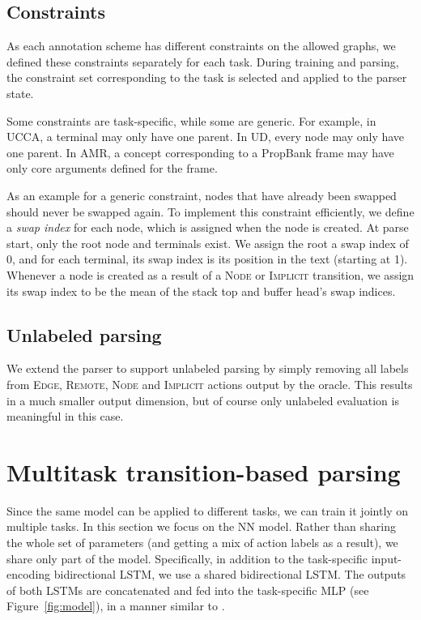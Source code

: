 \documentclass[11pt,a4paper]{article}
\begin{document}
\subsection{Constraints}

As each annotation scheme has different constraints on the allowed graphs,
we defined these constraints separately for each task.
During training and parsing, the constraint set corresponding to the task is
selected and applied to the parser state.

Some constraints are task-specific, while some are generic.
For example, in UCCA, a terminal may only have one parent.
In UD, every node may only have one parent.
In AMR, a concept corresponding to a PropBank frame may have only core arguments defined for the frame.

As an example for a generic constraint, nodes that have already been swapped
should never be swapped again.
To implement this constraint efficiently, we define a \textit{swap index}
for each node, which is assigned when the node is created.
At parse start, only the root node and terminals exist.
We assign the root a swap index of 0, and for each terminal, its swap index
is its position in the text (starting at 1).
Whenever a node is created as a result of a \textsc{Node} or \textsc{Implicit}
transition, we assign its swap index to be the mean of the stack top and buffer
head's swap indices.


\subsection{Unlabeled parsing}\label{sec:unlabeled}

We extend the parser to support unlabeled parsing by simply removing all labels from
\textsc{Edge}, \textsc{Remote}, \textsc{Node} and \textsc{Implicit} actions output by the oracle.
This results in a much smaller output dimension, but of course only unlabeled evaluation is
meaningful in this case.



\section{Multitask transition-based parsing}\label{sec:multitask}

Since the same model can be applied to different tasks, we can train it jointly on multiple tasks.
In this section we focus on the NN model.
Rather than sharing the whole set of parameters (and getting a mix of action labels as a result),
we share only part of the model.
Specifically, in addition to the task-specific input-encoding bidirectional LSTM,
we use a shared bidirectional LSTM. The outputs of both LSTMs are concatenated and
fed into the task-specific MLP (see Figure~\ref{fig:model}),
in a manner similar to \citet{P17-1186}.
\end{document}
